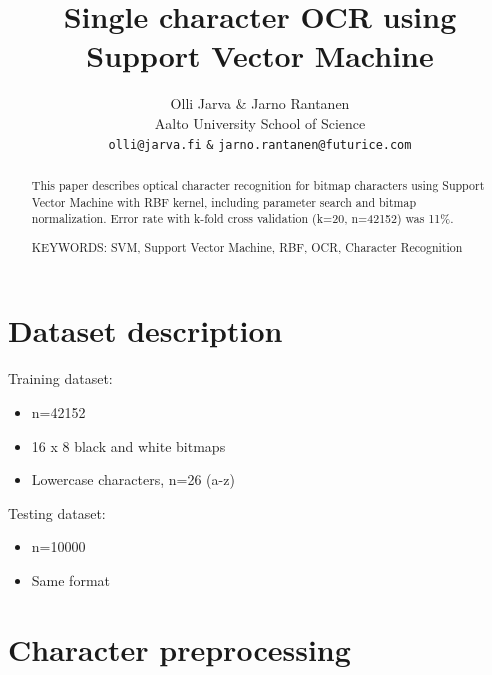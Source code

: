 \documentclass{netsec2012}
\begin{document}

\title{Single character OCR using Support Vector Machine}

\author{Olli Jarva \& Jarno Rantanen \\
        Aalto University School of Science \\
	\texttt{olli@jarva.fi} \texttt{\&} \texttt{jarno.rantanen@futurice.com}}
\maketitle


\begin{abstract}
  This paper describes optical character recognition for bitmap characters
  using Support Vector Machine with RBF kernel, including parameter search
  and bitmap normalization. 
  Error rate with k-fold cross validation (k=20, n=42152) was 11\%.

\vspace{3mm}
\noindent KEYWORDS: SVM, Support Vector Machine, RBF, OCR, Character Recognition

\end{abstract}


\section{Dataset description}

Training dataset:

\begin{itemize}
\item n=42152
\item 16 x 8 black and white bitmaps
\item Lowercase characters, n=26 (a-z)
\end{itemize}

Testing dataset:

\begin{itemize}
\item n=10000
\item Same format
\end{itemize}

\section{Character preprocessing}
\end{document}
